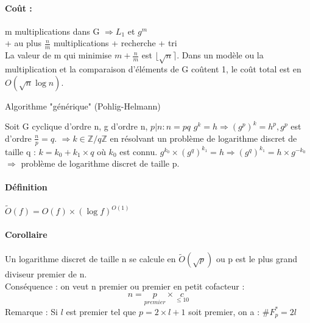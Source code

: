 \documentclass[12pt,a4paper]{report}
\begin{document}
\paragraph{Coût : }
m multiplications dans G $\Longrightarrow L_1$ et $ g^m$ \\
+ au plus $\frac{n}{m}$ multiplications + recherche + tri \\
La valeur de m qui minimise $ m + \frac{n}{m} $ est $ \lfloor \sqrt{n} \rceil $. Dans un modèle ou la multiplication et la comparaison d'éléments de G coûtent 1, le coût total est en $ O(\sqrt{n} \log n) $.
\begin{algorithm}
\caption{Algorithme "générique" (Pohlig-Helmann)}
\begin{algorithmic}
\STATE Soit G cyclique d'ordre n, g d'ordre n, $p|n :n=pq$
\STATE $g^k=h \Longrightarrow (g^p)^k = h^p, g^p $ est d'ordre $ \frac{n}{p}=q$.
\STATE $\Longrightarrow k \in \mathbb{Z}/q\mathbb{Z}$ en résolvant un problème de logarithme discret de taille q : 
\STATE $ k=k_0 + k_1\times q$ où $k_0$ est connu.
\STATE $g^{k_0} \times (g^q)^{k_1} = h \Rightarrow (g^q)^{k_1}=h \times g^{-k_0} $ 
\STATE $\Longrightarrow $ problème de logarithme discret de taille p.
\end{algorithmic}
\end{algorithm}
\paragraph{Définition\\}
$ \tilde{O}(f)=O(f)\times (\log{f})^{O(1)} $
\paragraph{Corollaire\\}
Un logarithme discret de taille n se calcule en $\tilde{O}(\sqrt{p})$ ou p est le plus grand diviseur premier de n.\\
Conséquence : on veut n premier ou premier en petit cofacteur : $$ n = \underset{premier}{p} \times \underset{\leqslant 10}c $$
Remarque : Si $l$ est premier tel que $p=2\times l + 1$ soit premier, on a : $\# F_{p}^{*} = 2l$
\end{document}
